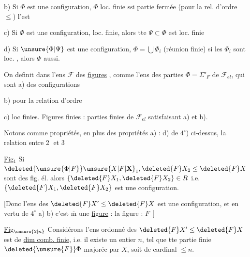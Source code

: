 
b) Si $\Phi$ est une configuration, $\Phi$ loc. finie ssi   partie fermée (pour la rel. d'ordre $\leq$) l'est

c) Si $\Phi$ est une configuration,  loc. finie, alors tte $\Psi\subset\Phi$ est loc. finie

d) Si $\unsure{\Phi|\Psi}$ est une configuration, $\Phi=\bigcup\Phi_i$ (réunion finie) si les $\Phi_i$ sont loc. , alors $\Phi$ aussi.


On definit dans l'ens $\mathcal{F}$ des \uline{figures} , comme l'ens des parties $\Phi={\Sigma}'_{F}$ de $\mathcal{F}_{el}$, qui sont a) des configurations

b)  pour la relation d'ordre

c) loc finies. Figures \uline{finies} : parties finies de $\mathcal{F}_{el}$ satisfaisant a) et b).


Notons comme propriétés, en plus des propriétés a) : d) de $4^\circ$) ci-dessus, la relation entre \textcircled{2} et \textcircled{3}


\uline{Fig}$_1$ Si $\deleted{\unsure{\Phi|F}}\unsure{X|F|\mathbf{X}}_1,\deleted{F}X_2\leq\deleted{F}X$ sont des fig. él. alors $\{\deleted{F}X_1,\deleted{F}X_2\}\in R$ i.e. $\{\deleted{F}X_1,\deleted{F}X_2\}$ est une configuration.

[Donc l'ens des $\deleted{F}X'\leq\deleted{F}X$ est une configuration, et en vertu de $4^\circ$ a) b) c'est $\overline{\mathrm{m}}$ une \uline{figure} : la figure  : $F$\unsure{\ldots|\,--}\ ]



\uline{Fig}$_{\unsure{2|n}}$  Considérons l'ens ordonné des $\deleted{F}X'\leq\deleted{F}X$ est de \uline{dim comb. finie}, i.e. il existe un entier $n$, tel que tte partie finie $\deleted{\unsure{F}}\Phi$  majorée par $X$,  soit de cardinal $\leq n$.

